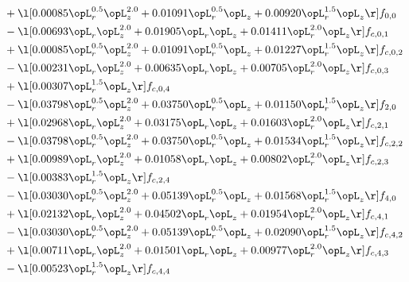 \begin{alignat}{2}
& + \l[  0.00085 \opL_r^{0.5} \opL_z^{2.0} +  0.01091 \opL_r^{0.5} \opL_z +  0.00920 \opL_r^{1.5} \opL_z  \r] f_{0,0} \nonumber \\ 
& - \l[  0.00693 \opL_r \opL_z^{2.0} +  0.01905 \opL_r \opL_z +  0.01411 \opL_r^{2.0} \opL_z  \r] f_{c,0,1} \nonumber \\ 
& + \l[  0.00085 \opL_r^{0.5} \opL_z^{2.0} +  0.01091 \opL_r^{0.5} \opL_z +  0.01227 \opL_r^{1.5} \opL_z  \r] f_{c,0,2} \nonumber \\ 
& - \l[  0.00231 \opL_r \opL_z^{2.0} +  0.00635 \opL_r \opL_z +  0.00705 \opL_r^{2.0} \opL_z  \r] f_{c,0,3} \nonumber \\ 
& + \l[  0.00307 \opL_r^{1.5} \opL_z  \r] f_{c,0,4} \nonumber \\ 
& - \l[  0.03798 \opL_r^{0.5} \opL_z^{2.0} +  0.03750 \opL_r^{0.5} \opL_z +  0.01150 \opL_r^{1.5} \opL_z  \r] f_{2,0} \nonumber \\ 
& + \l[  0.02968 \opL_r \opL_z^{2.0} +  0.03175 \opL_r \opL_z +  0.01603 \opL_r^{2.0} \opL_z  \r] f_{c,2,1} \nonumber \\ 
& - \l[  0.03798 \opL_r^{0.5} \opL_z^{2.0} +  0.03750 \opL_r^{0.5} \opL_z +  0.01534 \opL_r^{1.5} \opL_z  \r] f_{c,2,2} \nonumber \\ 
& + \l[  0.00989 \opL_r \opL_z^{2.0} +  0.01058 \opL_r \opL_z +  0.00802 \opL_r^{2.0} \opL_z  \r] f_{c,2,3} \nonumber \\ 
& - \l[  0.00383 \opL_r^{1.5} \opL_z  \r] f_{c,2,4} \nonumber \\ 
& - \l[  0.03030 \opL_r^{0.5} \opL_z^{2.0} +  0.05139 \opL_r^{0.5} \opL_z +  0.01568 \opL_r^{1.5} \opL_z  \r] f_{4,0} \nonumber \\ 
& + \l[  0.02132 \opL_r \opL_z^{2.0} +  0.04502 \opL_r \opL_z +  0.01954 \opL_r^{2.0} \opL_z  \r] f_{c,4,1} \nonumber \\ 
& - \l[  0.03030 \opL_r^{0.5} \opL_z^{2.0} +  0.05139 \opL_r^{0.5} \opL_z +  0.02090 \opL_r^{1.5} \opL_z  \r] f_{c,4,2} \nonumber \\ 
& + \l[  0.00711 \opL_r \opL_z^{2.0} +  0.01501 \opL_r \opL_z +  0.00977 \opL_r^{2.0} \opL_z  \r] f_{c,4,3} \nonumber \\ 
& - \l[  0.00523 \opL_r^{1.5} \opL_z  \r] f_{c,4,4} \nonumber \\ 
\end{alignat} 


